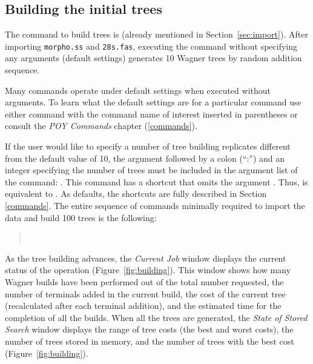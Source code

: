 {\subsection{Building the initial trees}

The command to build trees is  (already mentioned in Section~\ref{sec:import}). After 
importing \texttt{morpho.ss} and \texttt{28s.fas}, executing the command  without specifying 
any arguments (default settings) generates 10 Wagner trees by random addition sequence.

Many \poy commands operate under default settings when executed without arguments. To learn what the default settings 
are for a particular command use either  command with the command name of interest inserted in parentheses or 
consult the \emph{POY Commands} chapter (\ref{commands}).

If the user would like to specify a number of tree building replicates different from the default value of 10, the argument 
 followed by a colon (``:'') and an integer specifying the number of trees must be included in the 
argument list of the  command: . This command has a shortcut 
that omits the argument . Thus,  is equivalent to . 
As defaults, the shortcuts are fully described in Section \ref{commands}. The entire sequence of commands minimally required 
to import the data and build 100 trees is the following:

\begin{quote}
\\
\end{quote}

As the tree building advances, the \emph{Current Job} window displays the current status of the operation (Figure~\ref{fig:building}). 
This window shows how many Wagner builds have been performed out of the total number requested, the number of terminals added
in the current build, the cost of the current tree (recalculated after each terminal addition), and the estimated time for the completion of 
all the builds. When all the trees are generated, the \emph{State of Stored Search} window displays the range of tree costs (the best 
and worst costs), the number of trees stored in memory, and the number of trees with the best cost (Figure~\ref{fig:building}).

}
